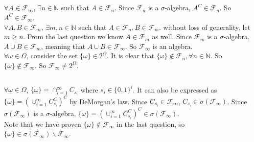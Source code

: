 \documentclass[12pt,letterpaper]{article}
\begin{document}
\subsection{}
$\forall A\in\mathcal{F}_{\infty}$, $\exists n\in\mathbb{N}$ such that $A\in\mathcal{F}_{n}$. Since $\mathcal{F}_{n}$ is a $\sigma$-algebra, $A^C\in\mathcal{F}_{n}$. So $A^C\in\mathcal{F}_{\infty}$.\\
$\forall A,B\in\mathcal{F}_{\infty}$, $\exists m,n\in\mathbb{N}$ such that $A\in\mathcal{F}_n,B\in\mathcal{F}_m$. without loss of generality, let $m\geq n$. From the last question we know $A\in\mathcal{F}_m$ as well. Since $\mathcal{F}_m$ is a $\sigma$-algebra, $A\cup B\in\mathcal{F}_m$, meaning that $A\cup B\in\mathcal{F}_{\infty}$. So $\mathcal{F}_{\infty}$ is an algebra.\\
$\forall\omega\in\Omega$, consider the set $\{\omega\}\in 2^{\Omega}$. It is clear that $\{\omega\}\notin\mathcal{F}_{n},\forall n\in\mathbb{N}$. So $\{\omega\}\notin\mathcal{F}_{\infty}$. So $\mathcal{F}_{\infty}\neq 2^{\Omega}$. 
\subsection{}
$\forall\omega\in\Omega$, $\{\omega\}=\cap_{i=1}^{\infty}C_{s_i}$ where $s_i\in\{0,1\}^i$. It can also be expressed as $\{\omega\}=(\cup_{i=1}^{\infty}C_{s_i}^C)^C$ by DeMorgan's law.
Since $C_{s_i}\in\mathcal{F}_{\infty}$, $C_{s_i}\in\sigma(\mathcal{F}_{\infty})$. Since $\sigma(\mathcal{F}_{\infty})$ is a $\sigma$-algebra, $\{\omega\}=(\cup_{i=1}^{\infty}C_{s_i}^C)^C\in\sigma(\mathcal{F}_{\infty})$.\\
Note that we have proven $\{\omega\}\notin\mathcal{F}_{\infty}$ in the last question, so $\{\omega\}\in\sigma(\mathcal{F}_{\infty})\backslash \mathcal{F}_{\infty}$.
\end{document}
